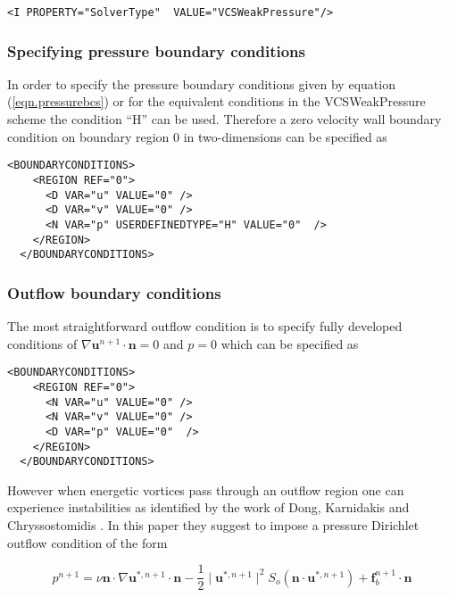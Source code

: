 \begin{lstlisting}[style=XMLStyle]
<I PROPERTY="SolverType"  VALUE="VCSWeakPressure"/>
\end{lstlisting}

\subsubsection{Specifying pressure boundary conditions}

In order to specify the pressure boundary conditions given by equation
(\ref{eqn.pressurebcs}) or for the equivalent conditions in the VCSWeakPressure
scheme the  condition ``H'' can be
used. Therefore a zero velocity wall boundary condition on boundary
region 0 in two-dimensions can be specified as

\begin{lstlisting}[style=XMLStyle]
  <BOUNDARYCONDITIONS>
    <REGION REF="0">
      <D VAR="u" VALUE="0" />
      <D VAR="v" VALUE="0" />
      <N VAR="p" USERDEFINEDTYPE="H" VALUE="0"  />
    </REGION>
  </BOUNDARYCONDITIONS>
\end{lstlisting}


\subsubsection{Outflow boundary conditions}

The most straightforward outflow condition is to specify fully
developed conditions of $\nabla\mathbf{u}^{n+1}\cdot \mathbf{n}=0$ and
$p=0$ which can be specified as 

\begin{lstlisting}[style=XMLStyle]
  <BOUNDARYCONDITIONS>
    <REGION REF="0">
      <N VAR="u" VALUE="0" />
      <N VAR="v" VALUE="0" />
      <D VAR="p" VALUE="0"  />
    </REGION>
  </BOUNDARYCONDITIONS>
\end{lstlisting}

However when energetic vortices pass through an outflow region one can
experience instabilities as identified by the work of Dong, Karnidakis
and Chryssostomidis \cite{DoKa14}. In this paper they suggest to
impose a pressure Dirichlet outflow condition of the form

\begin{equation}
 p^{n+1}= \nu \mathbf{n} \cdot \nabla\mathbf{u}^{*,n+1}\cdot \mathbf{n}-\frac{1}{2}
 \mid \mathbf{u}^{*,n+1} \mid^2 S_o(\mathbf{n}\cdot
 \mathbf{u}^{*,n+1})+\mathbf{f}_b^{n+1}\cdot \mathbf{n}
\end{equation}

